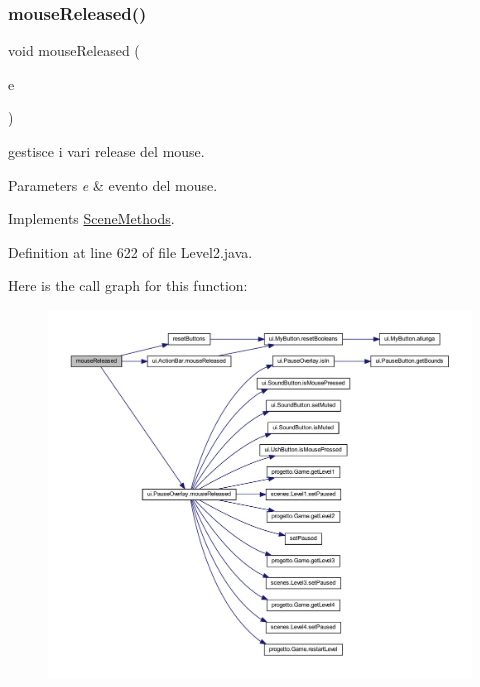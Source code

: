 \subsubsection{\texorpdfstring{mouse\+Released()}{mouseReleased()}}
{\footnotesize\ttfamily void mouse\+Released (\begin{DoxyParamCaption}\item[{Mouse\+Event}]{e }\end{DoxyParamCaption})}



gestisce i vari release del mouse. 


\begin{DoxyParams}{Parameters}
{\em e} & evento del mouse. \\
\hline
\end{DoxyParams}


Implements \hyperlink{interfacescenes_1_1_scene_methods_a87a07291794e15052db67f945d90853e}{Scene\+Methods}.



Definition at line 622 of file Level2.\+java.

Here is the call graph for this function\+:\nopagebreak
\begin{figure}[H]
\begin{center}
\leavevmode
\includegraphics[width=350pt]{classscenes_1_1_level2_a87a07291794e15052db67f945d90853e_cgraph}
\end{center}
\end{figure}
\mbox{\label{classscenes_1_1_level2_addba85b44e35a186e066b2e801f433c4}} 
